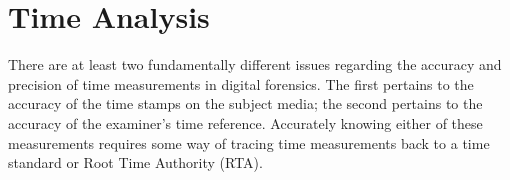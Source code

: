 \chapter{Time Analysis}

There are at least two
fundamentally different issues regarding the accuracy and precision of
time measurements in digital forensics. The first pertains to the accuracy of
the time stamps on the subject media; the second pertains to the
accuracy of the examiner's time reference. Accurately knowing either
of these measurements requires some way of tracing time measurements
back to a time standard or Root Time Authority (RTA)\cite{dfrws2002:MichaelDuren}.

\cite{dfrws2011:AndrewMarringtonAndIbrahimBaggiliAndGeorgeMohayAndAndrewClark}

